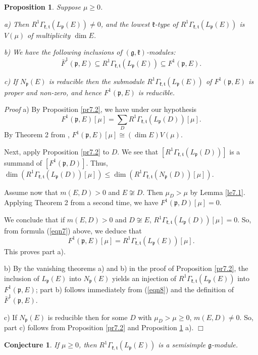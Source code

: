 \documentclass[11pt]{amsart}
\newcounter{theorem}
\newtheorem{prop}[theo]{Proposition}
\newtheorem{conjecture}[theo]{Conjecture}
\renewenvironment{proof}{ \emph{Proof}}{$\Box$}
\renewcommand{\tt}{\mathfrak{t}}
\newcommand{\kk}{\mathfrak{k}}
\newcommand{\pp}{\mathfrak{p}}
\renewcommand{\gg}{\mathfrak{g}}
\newcommand{\refle}[1]{Lemma \ref{#1}}
\newcommand{\refprop}[1]{Proposition \ref{#1}}
\newcommand{\refeq}[1]{(\ref{#1})}
\begin{document}
\begin{prop}\label{pr7.3}
Suppose $\mu\geq 0$.

a) Then $R^1\Gamma_{\kk,\tt}(L_\pp(E))\neq 0$, and the lowest $\kk$-type of $R^1\Gamma_{\kk,\tt}(L_\pp(E))$ is $V(\mu)$ of multiplicity $\dim E$.

b) We have the following inclusions of $(\gg,\kk)$-modules: $$\bar{F}^1(\pp,E)\subseteq R^1\Gamma_{\kk,\tt}(L_\pp(E))\subseteq F^1(\pp,E).$$

c) If $N_\pp(E)$ is reducible then the submodule $R^1\Gamma_{\kk,\tt}(L_\pp(E))$ of $F^1(\pp,E)$ is proper and non-zero, and hence $F^1(\pp,E)$ is reducible.
\end{prop}
\begin{proof}
a) By \refprop{pr7.2}, we have under our hypothesis
\begin{equation}\label{eqn7}
F^1(\pp,E)[\mu]=\sum_D R^1\Gamma_{\kk,\tt}(L_\pp(D))[\mu].
\end{equation}
By Theorem 2 from \cite{PZ3}, $F^1(\pp,E)[\mu]\cong(\dim E)V(\mu)$. 

Next, apply \refprop{pr7.2} to $D$. We see that $[R^1\Gamma_{\kk,\tt}(L_\pp(D))]$ is a summand of $[F^1(\pp,D)]$. Thus, $\dim (R^1\Gamma_{\kk,\tt}(L_\pp(D))[\mu])\leq\dim (R^1\Gamma_{\kk,\tt}(N_\pp(D))[\mu])$.

Assume now that $m(E,D)>0$ and $E\not\cong D$. Then $\mu_D>\mu$ by \refle{le7.1}. Applying Theorem 2 from \cite{PZ3} a second time, we have $F^1(\pp,D)[\mu]=0$. 

We conclude that if $m(E,D)>0$ and $D\not\cong E$, $R^1\Gamma_{\kk,\tt}(L_\pp(D))[\mu]=0$. So, from formula \refeq{eqn7} above, we deduce that
\begin{equation}\label{eqn8}
F^1(\pp,E)[\mu]=R^1\Gamma_{\kk,\tt}(L_\pp(E))[\mu].
\end{equation}
This proves part a).

b) By the vanishing theorems a) and b) in the proof of \refprop{pr7.2}, the inclusion of $L_\pp(E)$ into $N_\pp(E)$ yields an injection of $R^1\Gamma_{\kk,\tt}(L_\pp(E))$ into $F^1(\pp,E)$; part b) follows immediately from \refeq{eqn8} and the definition of $\bar{F}^1(\pp,E)$.

c) If $N_\pp(E)$ is reducible then for some $D$ with $\mu_D>\mu\geq 0$, $m(E,D)\neq 0$. So, part c) follows from \refprop{pr7.2} and \refprop{pr7.3} a).
\end{proof}

\begin{conjecture}\label{conj7.4}
If $\mu\geq 0$, then $R^1\Gamma_{\kk,\tt}(L_\pp(E))$ is a semisimple $\gg$-module.
\end{conjecture}
\end{document}
